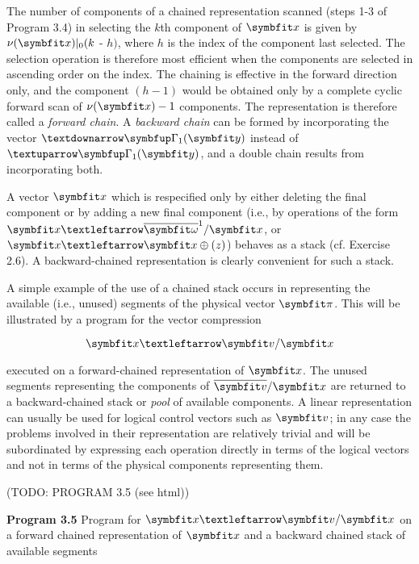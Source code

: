 \par The number of components of a chained representation scanned (steps 1-3 of Program 3.4) in selecting the $k$th component of $\vect{x}$ is given by $\nu(\vect{x})|_0(k$ - $h)$, where $h$ is the index of the component last selected. The selection operation is therefore most efficient when the components are selected in ascending order on the index. The chaining is effective in the forward direction only, and the component $(h - 1)$ would be obtained only by a complete cyclic forward scan of $\nu(\vect{x}) - 1$ components. The representation is therefore called a \textit{forward chain}. A \textit{backward chain} can be formed by incorporating the vector $↓\tree{\Gamma}_1(\vect{y})$ instead of $↑\tree{\Gamma}_1(\vect{y})$, and a double chain results from incorporating both.

\par A vector $\vect{x}$ which is respecified only by either deleting the final component or by adding a new final component (i.e., by operations of the form $\vect{x} ← \overline{\vect{\omega}}^1/\vect{x}$, or $\vect{x} ← \vect{x} \oplus (z)$) behaves as a stack (cf. Exercise 2.6). A backward-chained representation is clearly convenient for such a stack.

\par A simple example of the use of a chained stack occurs in representing the available (i.e., unused) segments of the physical vector $\vect{\pi}$. This will be illustrated by a program for the vector compression

$$
  \vect{x} ← \vect{v}/\vect{x}
$$

\par executed on a forward-chained representation of $\vect{x}$. The unused segments representing the components of $\overline{\vect{v}}/\vect{x}$ are returned to a backward-chained stack or \textit{pool} of available components. A linear representation can usually be used for logical control vectors such as $\vect{v}$; in any case the problems involved in their representation are relatively trivial and will be subordinated by expressing each operation directly in terms of the logical vectors and not in terms of the physical components representing them.

\par (TODO: PROGRAM 3.5 (see html))

\par \textbf{Program 3.5} Program for $\vect{x} ← \vect{v}/\vect{x}$ on a forward chained representation of $\vect{x}$ and a backward chained stack of available segments

